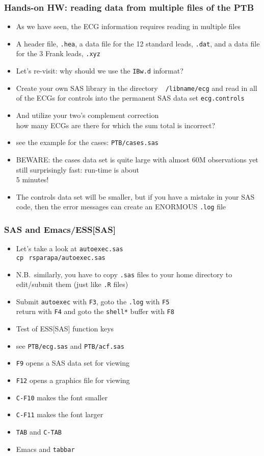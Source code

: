 \documentclass[11pt,pdftex,dvipsnames,usenames,helvetica]{beamer}
\begin{document}
\begin{frame}[fragile]
\frametitle{Hands-on HW: reading data from multiple files of the PTB}
\begin{itemize}
\item As we have seen, the ECG information requires reading in multiple files
\item A header file, {\tt .hea}, a data file for the 12 standard
  leads, {\tt .dat}, and a data file for the 3 Frank leads, {\tt .xyz}
\item Let's re-visit: why should we use the {\tt IBw.d} informat?
\item Create your own SAS library in the directory {\tt
    $~$/libname/ecg} and read in all of the ECGs for controls into the
  permanent SAS data set {\tt ecg.controls}
\item And utilize your two's complement correction\\
how many ECGs are there for which the sum total is incorrect?
\item see the example for the cases: {\tt PTB/cases.sas}
\item BEWARE: the cases data set is quite large with almost 60M observations
yet still surprisingly fast: run-time is about \\ 5 minutes!
\item The controls data set will be smaller, but if you have a mistake
in your SAS code,
then the error messages can create an ENORMOUS {\tt .log} file
\end{itemize}

\end{frame}

\begin{frame}[fragile]
\frametitle{SAS and Emacs/ESS[SAS]}
\begin{itemize}
\item Let's take a look at {\tt autoexec.sas}\\
{\tt cp $~$rsparapa/autoexec.sas $~$}
\item N.B.\ similarly, you have to copy {\tt .sas} files
to your home directory to edit/submit them (just like {\tt .R} files)
\item Submit {\tt autoexec} with {\tt F3}, goto the {\tt .log} with
  {\tt F5}\\ return with {\tt F4} and goto the {\tt *shell*} 
buffer with {\tt F8}
\item Test of ESS[SAS] function keys%
\item see {\tt PTB/ecg.sas} and {\tt PTB/acf.sas}
\item {\tt F9} opens a SAS data set for viewing
\item {\tt F12} opens a graphics file for viewing
\item {\tt C-F10} makes the font smaller
\item {\tt C-F11} makes the font larger
\item {\tt TAB} and {\tt C-TAB}
\item Emacs and {\tt tabbar}
\end{itemize}

\end{frame}
\end{document}
